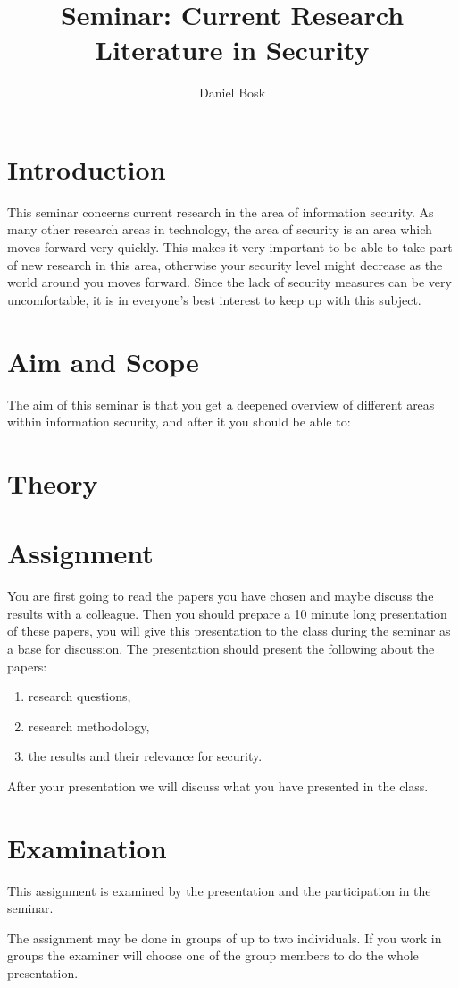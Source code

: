 \documentclass[a4paper]{llncs}
\title{Seminar: Current Research Literature in Security}
\author{%
  Daniel Bosk
}
\institute{%
  Department of Information and Communication Systems\\
  Mid Sweden University, Sundsvall
}
\begin{document}
\maketitle


\section{Introduction}
\label{sec:Introduction}

This seminar concerns current research in the area of information security.
As many other research areas in technology, the area of security is an area 
which moves forward very quickly.
This makes it very important to be able to take part of new research in this 
area, otherwise your security level might decrease as the world around you 
moves forward.
Since the lack of security measures can be very uncomfortable, it is in 
everyone's best interest to keep up with this subject.


\section{Aim and Scope}
\label{sec:Syfte}
The aim of this seminar is that you get a deepened overview of different areas 
within information security, and after it you should be able to:
\begin{itemize}
	
\end{itemize}


\section{Theory}
\label{sec:Theory}



\section{Assignment}

You are first going to read the papers you have chosen and maybe discuss the 
results with a colleague.
Then you should prepare a 10 minute long presentation of these papers, you will 
give this presentation to the class during the seminar as a base for 
discussion.
The presentation should present the following about the papers:
\begin{enumerate}
  \item research questions,
  \item research methodology,
  \item the results and their relevance for security.
\end{enumerate}
After your presentation we will discuss what you have presented in the class.


\section{Examination}
\label{sec:Examination}
This assignment is examined by the presentation and the participation in the 
seminar.

The assignment may be done in groups of up to two individuals.
If you work in groups the examiner will choose one of the group members to do 
the whole presentation.


\printbibliography{}
\end{document}

